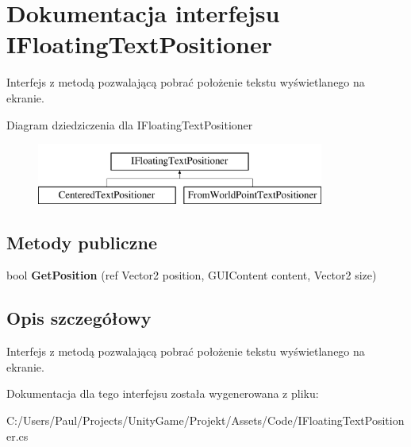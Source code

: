 \section{Dokumentacja interfejsu I\+Floating\+Text\+Positioner}
\label{interface_i_floating_text_positioner}


Interfejs z metodą pozwalającą pobrać położenie tekstu wyświetlanego na ekranie.  


Diagram dziedziczenia dla I\+Floating\+Text\+Positioner\begin{figure}[H]
\begin{center}
\leavevmode
\includegraphics[height=2.000000cm]{interface_i_floating_text_positioner}
\end{center}
\end{figure}
\subsection*{Metody publiczne}
\begin{DoxyCompactItemize}
\item 
bool {\bfseries Get\+Position} (ref Vector2 position, G\+U\+I\+Content content, Vector2 size)\label{interface_i_floating_text_positioner_af8540a70c6c4e7b71f85bf77f9821724}

\end{DoxyCompactItemize}


\subsection{Opis szczegółowy}
Interfejs z metodą pozwalającą pobrać położenie tekstu wyświetlanego na ekranie. 



Dokumentacja dla tego interfejsu została wygenerowana z pliku\+:\begin{DoxyCompactItemize}
\item 
C\+:/\+Users/\+Paul/\+Projects/\+Unity\+Game/\+Projekt/\+Assets/\+Code/I\+Floating\+Text\+Positioner.\+cs\end{DoxyCompactItemize}
